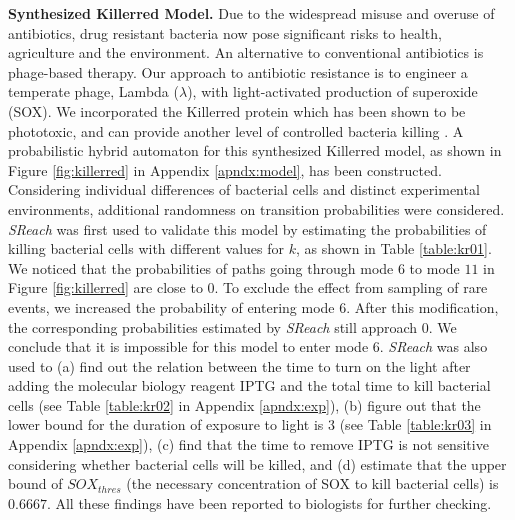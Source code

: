 \vspace{-.65cm}


{\bf Synthesized Killerred Model.} Due to the widespread misuse and overuse of antibiotics, drug resistant bacteria now pose significant risks to health, agriculture and the environment. An alternative to conventional antibiotics is phage-based therapy. Our approach to antibiotic resistance is to engineer a temperate phage, Lambda ($\lambda$), with light-activated production of superoxide (SOX). We incorporated the Killerred protein which has been shown to be phototoxic, and can provide another level of controlled bacteria killing \cite{natasa2014killerred}. A probabilistic hybrid automaton for this synthesized Killerred model, as shown in Figure \ref{fig:killerred} in Appendix \ref{apndx:model}, has been constructed. Considering individual differences of bacterial cells and distinct experimental environments, additional randomness on transition probabilities were considered. {\it SReach} was first used to validate this model by estimating the probabilities of killing bacterial cells with different values for $k$, as shown in Table \ref{table:kr01}. We noticed that the probabilities of paths going through mode $6$ to mode $11$ in Figure \ref{fig:killerred} are close to $0$. To exclude the effect from sampling of rare events, we increased the probability of entering mode $6$. After this modification, the corresponding probabilities estimated by {\it SReach} still approach $0$. We conclude that it is impossible for this model to enter mode $6$. {\it SReach} was also used to (a) find out the relation between the time to turn on the light after adding the molecular biology reagent IPTG and the total time to kill bacterial cells (see Table \ref{table:kr02} in Appendix \ref{apndx:exp}), (b) figure out that the lower bound for the duration of exposure to light is $3$ (see Table \ref{table:kr03} in Appendix \ref{apndx:exp}), (c) find that the time to remove IPTG is not sensitive considering whether bacterial cells will be killed, and (d) estimate that the upper bound of $SOX_{thres}$ (the necessary concentration of SOX to kill bacterial cells) is $0.6667$. All these findings have been reported to biologists for further checking.

